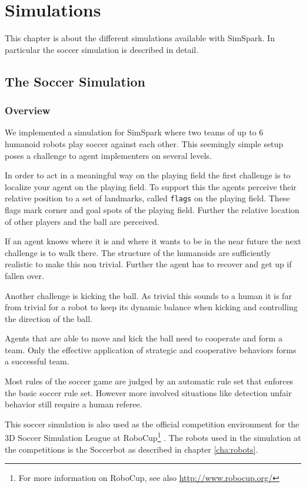 \chapter{Simulations}
\label{cha:simulations}

This chapter is about the different simulations available with
SimSpark. In particular the soccer simulation is described in detail.

\section{The Soccer Simulation}
\label{sec:soccersimulation}

\subsection{Overview}

We implemented a simulation for SimSpark where two teams of up to 6
humanoid robots play soccer against each other. This seemingly simple
setup poses a challenge to agent implementers on several levels.

In order to act in a meaningful way on the playing field the first
challenge is to localize your agent on the playing field. To support
this the agents perceive their relative position to a set of
landmarks, called \texttt{flags} on the playing field. These flags
mark corner and goal spots of the playing field. Further the relative
location of other players and the ball are perceived.

If an agent knows where it is and where it wants to be in the near
future the next challenge is to walk there. The structure of the
humanoids are sufficiently realistic to make this non trivial. Further
the agent has to recover and get up if fallen over.

Another challenge is kicking the ball. As trivial this sounds to a
human it is far from trivial for a robot to keep its dynamic balance
when kicking and controlling the direction of the ball.

Agents that are able to move and kick the ball need to cooperate and
form a team. Only the effective application of strategic and
cooperative behaviors forms a successful team.

Most rules of the soccer game are judged by an automatic rule set that
enforces the basic soccer rule set. However more involved situations
like detection unfair behavior still require a human referee.

This soccer simulation is also used as the official competition environment for the 3D Soccer Simulation League at RoboCup\footnote{For more information on RoboCup, see also \url{http://www.robocup.org/}} \cite{KAK+97}\cite{KA00}\cite{BMO+05}\cite{MBS+07}. The robots used in the simulation at the competitions is the Soccerbot as described in chapter \ref{cha:robots}.

